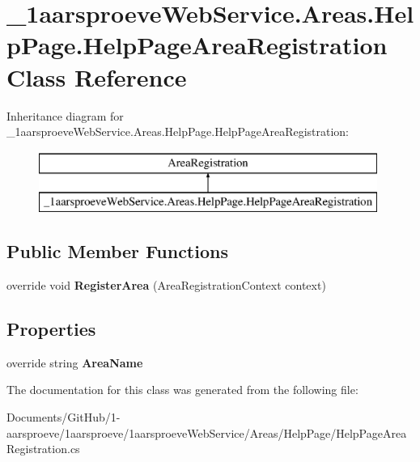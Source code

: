 \hypertarget{class__1aarsproeve_web_service_1_1_areas_1_1_help_page_1_1_help_page_area_registration}{}\section{\+\_\+1aarsproeve\+Web\+Service.\+Areas.\+Help\+Page.\+Help\+Page\+Area\+Registration Class Reference}
\label{class__1aarsproeve_web_service_1_1_areas_1_1_help_page_1_1_help_page_area_registration}
Inheritance diagram for \+\_\+1aarsproeve\+Web\+Service.\+Areas.\+Help\+Page.\+Help\+Page\+Area\+Registration\+:\begin{figure}[H]
\begin{center}
\leavevmode
\includegraphics[height=2.000000cm]{class__1aarsproeve_web_service_1_1_areas_1_1_help_page_1_1_help_page_area_registration}
\end{center}
\end{figure}
\subsection*{Public Member Functions}
\begin{DoxyCompactItemize}
\item 
\hypertarget{class__1aarsproeve_web_service_1_1_areas_1_1_help_page_1_1_help_page_area_registration_a2d995fdeaeb65a3da6b712389c462b39}{}override void {\bfseries Register\+Area} (Area\+Registration\+Context context)\label{class__1aarsproeve_web_service_1_1_areas_1_1_help_page_1_1_help_page_area_registration_a2d995fdeaeb65a3da6b712389c462b39}

\end{DoxyCompactItemize}
\subsection*{Properties}
\begin{DoxyCompactItemize}
\item 
\hypertarget{class__1aarsproeve_web_service_1_1_areas_1_1_help_page_1_1_help_page_area_registration_a9402b3b3aba317e0afa36ff4ddf0593f}{}override string {\bfseries Area\+Name}\label{class__1aarsproeve_web_service_1_1_areas_1_1_help_page_1_1_help_page_area_registration_a9402b3b3aba317e0afa36ff4ddf0593f}

\end{DoxyCompactItemize}


The documentation for this class was generated from the following file\+:\begin{DoxyCompactItemize}
\item 
Documents/\+Git\+Hub/1-\/aarsproeve/1aarsproeve/1aarsproeve\+Web\+Service/\+Areas/\+Help\+Page/Help\+Page\+Area\+Registration.\+cs\end{DoxyCompactItemize}
